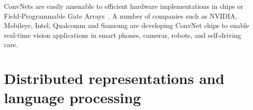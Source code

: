 \documentclass[10pts]{article}
\begin{document}

ConvNets are easily amenable to efficient hardware implementations in
chips or Field-Programmable Gate
Arrays~\cite{boser-92,farabet-suml-11}.  A number of companies such as
NVIDIA, Mobileye, Intel, Qualcomm and Samsung are developing ConvNet
chips to enable real-time vision applications in smart phones,
cameras, robots, and self-driving cars.



\section{Distributed representations and language processing}
\end{document}
